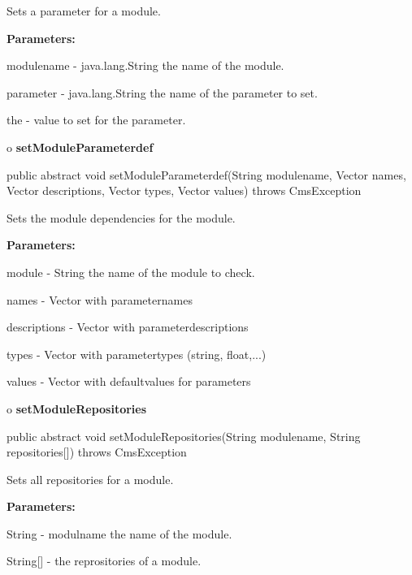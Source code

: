 \begin{description}
\htmlDD Sets a parameter for a module. 

\begin{description}
\item {\bf Parameters:}  

modulename - java.lang.String the name of the module.  

parameter - java.lang.String the name of the parameter to set.  

the - value to set for the parameter.  
\end{description}

\end{description}

o {\bf setModuleParameterdef} 

\begin{PRE}
 public abstract void setModuleParameterdef(String modulename,
                                            Vector names,
                                            Vector descriptions,
                                            Vector types,
                                            Vector values) throws CmsException
\end{PRE}

\begin{description}
\htmlDD Sets the module dependencies for the module. 

\begin{description}
\item {\bf Parameters:}  

module - String the name of the module to check.  

names - Vector with parameternames  

descriptions - Vector with parameterdescriptions  

types - Vector with parametertypes (string, float,...)  

values - Vector with defaultvalues for parameters  
\end{description}

\end{description}

o {\bf setModuleRepositories} 

\begin{PRE}
 public abstract void setModuleRepositories(String modulename,
                                            String repositories[]) throws CmsException
\end{PRE}

\begin{description}
\htmlDD Sets all repositories for a module. 

\begin{description}
\item {\bf Parameters:}  

String - modulname the name of the module.  

String[] - the reprositories of a module.  
\end{description}

\end{description}

